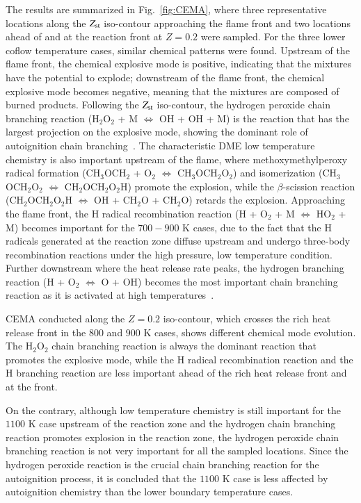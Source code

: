 \documentclass[review,3p,times]{elsarticle}
\begin{document}
The results are summarized in Fig.~\ref{fig:CEMA}, where three representative locations along the $Z_{\rm st}$ iso-contour approaching the flame front and two locations ahead of and at the reaction front at $Z = 0.2$ were sampled.  For the three lower coflow temperature cases, similar chemical patterns were found.  Upstream of the flame front, the \textcolor{mycolor}{chemical explosive mode is} positive, indicating that the mixtures have the potential to explode; downstream of the flame front, \textcolor{mycolor}{the chemical explosive mode becomes} negative, meaning that the mixtures are composed of burned products.  Following the $Z_{\rm st}$ iso-contour, the hydrogen peroxide chain branching reaction (H$_2$O$_2$ + M $\Longleftrightarrow$ OH + OH + M) is the reaction that has the largest projection on the explosive mode, showing the dominant role of autoignition chain branching\textcolor{mycolor}{~\cite{westbrook00}}.  The characteristic DME low temperature chemistry is also important upstream of the flame, where methoxymethylperoxy radical formation (CH$_3$OCH$_2$ + O$_2$ $\Longleftrightarrow$ CH$_3$OCH$_2$O$_2$) and isomerization (CH$_3$OCH$_2$O$_2$ $\Longleftrightarrow$ CH$_2$OCH$_2$O$_2$H) promote the explosion, while the $\beta$-scission reaction (CH$_2$OCH$_2$O$_2$H $\Longleftrightarrow$ OH + CH$_2$O + CH$_2$O) retards the explosion.  Approaching the flame front, the H radical recombination reaction (H + O$_2$ + M $\Longleftrightarrow$ HO$_2$ + M) becomes important for the $700-900$ K cases, due to the fact that the H radicals generated at the reaction zone diffuse upstream and undergo three-body recombination reactions under the high pressure, low temperature condition.  Further downstream where the heat release rate peaks, the hydrogen branching reaction (H + O$_2$ $\Longleftrightarrow$ O + OH) becomes the most important chain branching reaction \textcolor{mycolor}{as it is activated at high temperatures~\cite{westbrook00}.}

CEMA conducted along the $Z = 0.2$ iso-contour, which crosses the rich heat release front in the $800$ and $900$ K cases, shows different chemical mode evolution.  The H$_2$O$_2$ chain branching reaction is always the dominant reaction that promotes the explosive mode, while the H radical recombination reaction and the H branching reaction are less important ahead of the rich heat release front and at the front.  

On the contrary, although low temperature chemistry is still important for the $1100$ K case upstream of the reaction zone and the hydrogen chain branching reaction promotes explosion in the reaction zone, the hydrogen peroxide chain branching reaction is not very important for all the sampled locations.  Since the hydrogen peroxide reaction is the crucial chain branching reaction for the autoignition process, it is concluded that the $1100$ K case is less affected by autoignition chemistry than the lower boundary temperature cases.  
\end{document}
